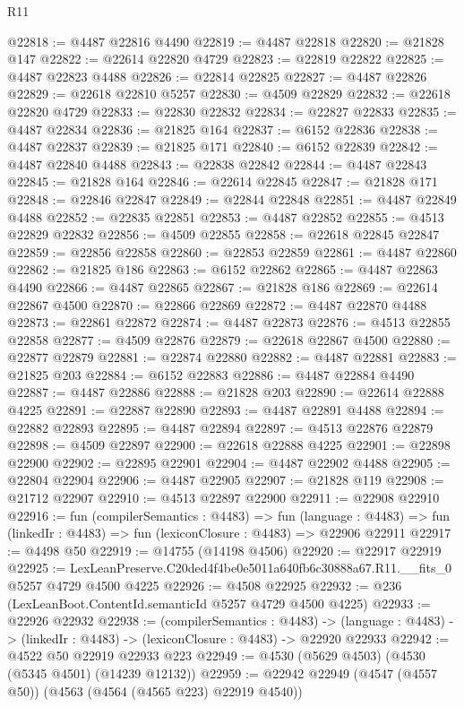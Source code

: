 \begin{lexlean}{R11}
\begin{coremodule}
@22818 := @4487 @22816 @4490
@22819 := @4487 @22818
@22820 := @21828 @147
@22822 := @22614 @22820 @4729
@22823 := @22819 @22822
@22825 := @4487 @22823 @4488
@22826 := @22814 @22825
@22827 := @4487 @22826
@22829 := @22618 @22810 @5257
@22830 := @4509 @22829
@22832 := @22618 @22820 @4729
@22833 := @22830 @22832
@22834 := @22827 @22833
@22835 := @4487 @22834
@22836 := @21825 @164
@22837 := @6152 @22836
@22838 := @4487 @22837
@22839 := @21825 @171
@22840 := @6152 @22839
@22842 := @4487 @22840 @4488
@22843 := @22838 @22842
@22844 := @4487 @22843
@22845 := @21828 @164
@22846 := @22614 @22845
@22847 := @21828 @171
@22848 := @22846 @22847
@22849 := @22844 @22848
@22851 := @4487 @22849 @4488
@22852 := @22835 @22851
@22853 := @4487 @22852
@22855 := @4513 @22829 @22832
@22856 := @4509 @22855
@22858 := @22618 @22845 @22847
@22859 := @22856 @22858
@22860 := @22853 @22859
@22861 := @4487 @22860
@22862 := @21825 @186
@22863 := @6152 @22862
@22865 := @4487 @22863 @4490
@22866 := @4487 @22865
@22867 := @21828 @186
@22869 := @22614 @22867 @4500
@22870 := @22866 @22869
@22872 := @4487 @22870 @4488
@22873 := @22861 @22872
@22874 := @4487 @22873
@22876 := @4513 @22855 @22858
@22877 := @4509 @22876
@22879 := @22618 @22867 @4500
@22880 := @22877 @22879
@22881 := @22874 @22880
@22882 := @4487 @22881
@22883 := @21825 @203
@22884 := @6152 @22883
@22886 := @4487 @22884 @4490
@22887 := @4487 @22886
@22888 := @21828 @203
@22890 := @22614 @22888 @4225
@22891 := @22887 @22890
@22893 := @4487 @22891 @4488
@22894 := @22882 @22893
@22895 := @4487 @22894
@22897 := @4513 @22876 @22879
@22898 := @4509 @22897
@22900 := @22618 @22888 @4225
@22901 := @22898 @22900
@22902 := @22895 @22901
@22904 := @4487 @22902 @4488
@22905 := @22804 @22904
@22906 := @4487 @22905
@22907 := @21828 @119
@22908 := @21712 @22907
@22910 := @4513 @22897 @22900
@22911 := @22908 @22910
@22916 := fun (compilerSemantics : @4483) =>
  fun (language : @4483) => fun (linkedIr : @4483) => fun (lexiconClosure : @4483) => @22906 @22911
@22917 := @4498 @50
@22919 := @14755 (@14198 @4506)
@22920 := @22917 @22919
@22925 := LexLeanPreserve.C20ded4f4be0e5011a640fb6c30888a67.R11.__fits_0 @5257 @4729 @4500 @4225
@22926 := @4508 @22925
@22932 := @236 (LexLeanBoot.ContentId.semanticId @5257 @4729 @4500 @4225)
@22933 := @22926 @22932
@22938 := (compilerSemantics : @4483) ->
  (language : @4483) -> (linkedIr : @4483) -> (lexiconClosure : @4483) -> @22920 @22933
@22942 := @4522 @50 @22919 @22933 @223
@22949 := @4530 (@5629 @4503) (@4530 (@5345 @4501) (@14239 @12132))
@22959 := @22942 @22949 (@4547 (@4557 @50)) (@4563 (@4564 (@4565 @223) @22919 @4540))

\end{coremodule}
\end{lexlean}
